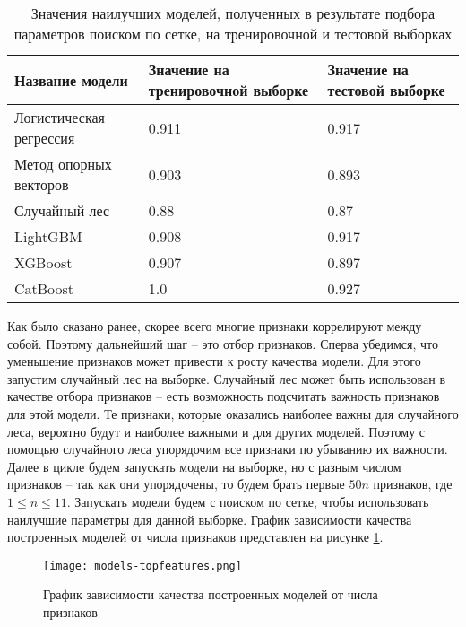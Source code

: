 \begin{table}[!htbp]
	\centering
	\small
	\caption{Значения наилучших моделей, полученных в результате подбора параметров поиском по сетке, на тренировочной и тестовой выборках}
	\begin{tabularx}{\linewidth}{|X|X|X|}
		\hline
		Название модели & Значение на тренировочной выборке & Значение на тестовой выборке\\ \hline
		Логистическая регрессия & 0.911 & 0.917 \\
		\hline 
		Метод опорных векторов & 0.903 & 0.893 \\
		\hline
		Случайный лес & 0.88 & 0.87 \\
		\hline
		LightGBM & 0.908 & 0.917 \\
		\hline
		XGBoost & 0.907 & 0.897 \\ 
		\hline
		CatBoost & 1.0 & 0.927 \\ 
		\hline
	\end{tabularx}	
	\label{tabl:gridsearch}
\end{table}

Как было сказано ранее, скорее всего многие признаки коррелируют между собой. Поэтому дальнейший шаг -- это отбор признаков. Сперва убедимся, что уменьшение признаков может привести к росту качества модели. Для этого запустим случайный лес на выборке. Случайный лес может быть использован в качестве отбора признаков -- есть возможность подсчитать важность признаков для этой модели. Те признаки, которые оказались наиболее важны для случайного леса, вероятно будут и наиболее важными и для других моделей. Поэтому с помощью случайного леса упорядочим все признаки по убыванию их важности. Далее в цикле будем запускать модели на выборке, но с разным числом признаков -- так как они упорядочены, то будем брать первые $50n$ признаков, где $1 \leq n \leq 11$. Запускать модели будем с поиском по сетке, чтобы использовать наилучшие параметры для данной выборке. График зависимости качества построенных моделей от числа признаков представлен на рисунке \ref{accuracy-numFeatures}.

\begin{figure}[!htbp]
	\begin{center}
		\texttt{[image: models-topfeatures.png]}\\
		\caption{График зависимости качества построенных моделей от числа признаков}
		\label{accuracy-numFeatures}
	\end{center}
\end{figure}

